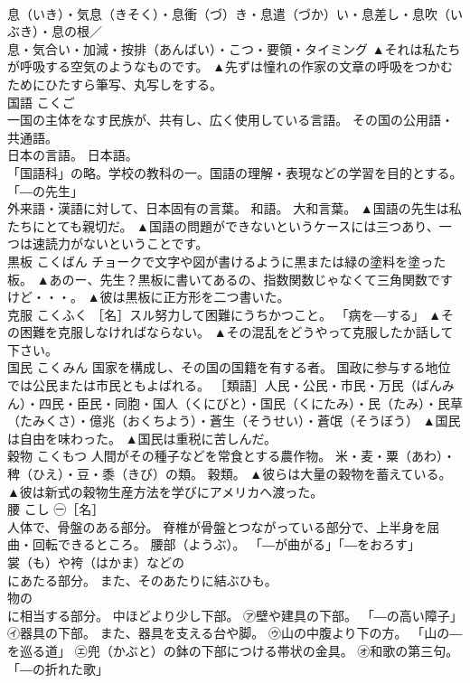 \documentclass[8pt]{extreport}
\begin{document}
\begin{CJK}{UTF8}{min}
\\	息（いき）・気息（きそく）・息衝（づ）き・息遣（づか）い・息差し・息吹（いぶき）・息の根／
\\	息・気合い・加減・按排（あんばい）・こつ・要領・タイミング	▲それは私たちが呼吸する空気のようなものです。 ▲先ずは憧れの作家の文章の呼吸をつかむためにひたすら筆写、丸写しをする。
\\	国語	こくご	
\\	一国の主体をなす民族が、共有し、広く使用している言語。 その国の公用語・共通語。 
\\	日本の言語。 日本語。 
\\	「国語科」の略。学校の教科の一。国語の理解・表現などの学習を目的とする。 「―の先生」 
\\	外来語・漢語に対して、日本固有の言葉。 和語。 大和言葉。	▲国語の先生は私たちにとても親切だ。 ▲国語の問題ができないというケースには三つあり、一つは速読力がないということです。
\\	黒板	こくばん	チョークで文字や図が書けるように黒または緑の塗料を塗った板。	▲あのー、先生？黒板に書いてあるの、指数関数じゃなくて三角関数ですけど・・・。 ▲彼は黒板に正方形を二つ書いた。
\\	克服	こくふく	［名］スル努力して困難にうちかつこと。 「病を―する」	▲その困難を克服しなければならない。 ▲その混乱をどうやって克服したか話して下さい。
\\	国民	こくみん	国家を構成し、その国の国籍を有する者。 国政に参与する地位では公民または市民ともよばれる。 ［類語］人民・公民・市民・万民（ばんみん）・四民・臣民・同胞・国人（くにびと）・国民（くにたみ）・民（たみ）・民草（たみくさ）・億兆（おくちよう）・蒼生（そうせい）・蒼氓（そうぼう）	▲国民は自由を味わった。 ▲国民は重税に苦しんだ。
\\	穀物	こくもつ	人間がその種子などを常食とする農作物。 米・麦・粟（あわ）・稗（ひえ）・豆・黍（きび）の類。 穀類。	▲彼らは大量の穀物を蓄えている。 ▲彼は新式の穀物生産方法を学びにアメリカへ渡った。
\\	腰	こし	㊀［名］ 
\\	人体で、骨盤のある部分。 脊椎が骨盤とつながっている部分で、上半身を屈曲・回転できるところ。 腰部（ようぶ）。 「―が曲がる」「―をおろす」 
\\	裳（も）や袴（はかま）などの 
\\	にあたる部分。 また、そのあたりに結ぶひも。 
\\	物の 
\\	に相当する部分。 中ほどより少し下部。 ㋐壁や建具の下部。 「―の高い障子」 ㋑器具の下部。 また、器具を支える台や脚。 ㋒山の中腹より下の方。 「山の―を巡る道」 ㋓兜（かぶと）の鉢の下部につける帯状の金具。 ㋔和歌の第三句。 「―の折れた歌」 

\end{CJK}
\end{document}
